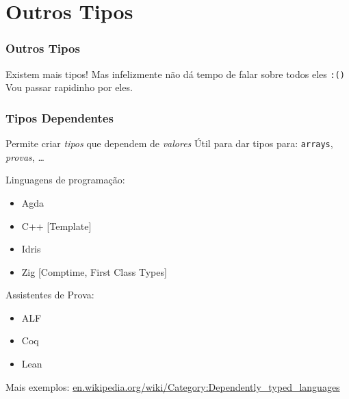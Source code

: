 \documentclass{beamer}
\begin{document}
\section{Outros Tipos}
\begin{frame}
    \frametitle{Outros Tipos}
    Existem mais tipos!
    \vfill
    Mas infelizmente não dá tempo de falar sobre todos eles
    \texttt{:(\phantom)}
    \vfill
    Vou passar rapidinho por eles.
\end{frame}

\begin{frame}
    \frametitle{Tipos Dependentes}
    Permite criar \emph{tipos} que dependem de \emph{valores}
    \vfill
    Útil para dar tipos para: \texttt{arrays}, \emph{provas}, \dots
    \vfill
    \begin{multicols}{2}
        Linguagens de programação:
        \begin{itemize}
            \item Agda
            \item C++ [Template]
            \item Idris
            \item Zig [Comptime, First Class Types]
        \end{itemize}
        \columnbreak
        Assistentes de Prova:
        \begin{itemize}
            \item ALF
            \item Coq
            \item Lean
        \end{itemize}
    \end{multicols}
    \vfill
    Mais exemplos:
    \url{en.wikipedia.org/wiki/Category:Dependently_typed_languages}
\end{frame}
\end{document}
